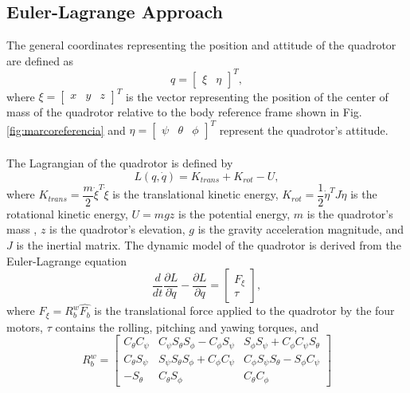 \subsection{Euler-Lagrange Approach}
The general coordinates representing the position and attitude of the quadrotor are defined as
\begin{equation}
	q=\begin{bmatrix}
	\xi & \eta
	\end{bmatrix}^{T},
	\label{ec:coorgenerales}
\end{equation}
where $\xi=\begin{bmatrix}
x & y & z
\end{bmatrix}^{T}$ is the vector representing the position of the center of mass of the quadrotor relative to the body reference frame shown in Fig. \ref{fig:marcoreferencia} and $\eta=\begin{bmatrix}
\psi & \theta & \phi
\end{bmatrix}^{T}$ represent the quadrotor's attitude.
\\\\
The Lagrangian of the quadrotor is defined by
\begin{equation}
	L(q,\dot{q})=K_{trans}+K_{rot} - U,	
	\label{ec:lagrangiano}
\end{equation}
where $ K_{trans} = \dfrac{m}{2}\dot{\xi}^{T}\dot{\xi} $ is the translational kinetic energy, $ K_{rot} = \dfrac{1}{2}\dot{\eta}^{T}J\dot{\eta} $ is the rotational kinetic energy, $ U=mgz $ is the potential energy, $m$ is the quadrotor's mass , $z$ is the quadrotor's elevation, $g$ is the gravity acceleration magnitude, and $J$ is the inertial matrix. The dynamic model of the quadrotor is derived from the Euler-Lagrange equation
\begin{equation}
	\dfrac{d}{dt}\dfrac{\partial L}{\partial \dot{q}}-\dfrac{\partial L}{\partial q}=
	\begin{bmatrix}
	F_{\xi}\\
	\tau
	\end{bmatrix},
	\label{ec:eulerlag}
 \end{equation} 
where $F_{\xi}=R_{b}^{w}\hat{F_{b}}$ is the translational force applied to the quadrotor by the four motors, $\tau$ contains the rolling, pitching and yawing torques, and 
\begin{equation}
R_{b}^{w} = \begin{bmatrix}
C_\theta C_\psi & C_\psi S_\theta S_\phi-C_\phi S_\psi & S_\phi S_\psi+C_\phi C_\psi S_\theta\\
C_\theta S_\psi & S_\psi S_\theta S_\phi+C_\phi C_\psi & C_\phi S_\psi S_\theta - S_\phi C_\psi\\
-S_\theta & C_\theta S_\phi & C_\theta C_\phi
\end{bmatrix}
\end{equation}
